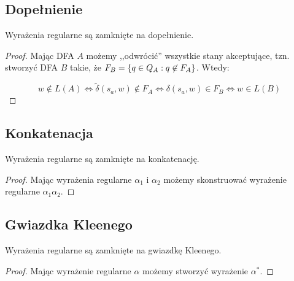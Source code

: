 \subsection{Dopełnienie}

\begin{theorem}
Wyrażenia regularne są zamknięte na dopełnienie.
\end{theorem}
\begin{proof}
 Mając DFA \(A\) możemy ,,odwrócić'' wszystkie stany akceptujące, tzn. stworzyć DFA \(B\) takie, że \(F_B = \set{q \in Q_A : q \not \in F_A}\). Wtedy:
 
 \[ 
    w \not\in L(A) \iff \tilde \delta(s_a, w) \not \in F_A \iff \delta(s_a, w) \in F_B \iff w \in L(B)
 \]
\end{proof}

\subsection{Konkatenacja}

\begin{theorem}
Wyrażenia regularne są zamknięte na konkatenację.
\end{theorem}

\begin{proof}
 Mając wyrażenia regularne \(\alpha_1\) i \(\alpha_2\) możemy skonstruować wyrażenie regularne \( \alpha_1 \alpha_2 \). 
\end{proof}

\subsection{Gwiazdka Kleenego} 

\begin{theorem}
Wyrażenia regularne są zamknięte na gwiazdkę Kleenego.
\end{theorem}

\begin{proof}
 Mając wyrażenie regularne \(\alpha\) możemy stworzyć wyrażenie \(\alpha^*\).
\end{proof}